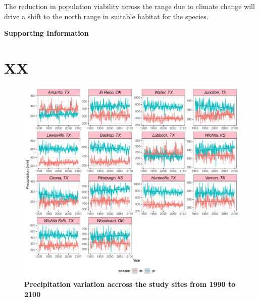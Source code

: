 \documentclass[12pt]{article}
\begin{document}
The reduction in population viability across the range due to climate change will drive a shift to the north range in suitable habitat for the species. 


\newpage


\newpage
\clearpage 
\setcounter{equation}{0}
\setcounter{figure}{0}
\setcounter{section}{0}
\setcounter{table}{0}
\renewcommand{\theequation}{S.\arabic{equation}}
\renewcommand{\thetable}{S-\arabic{table}}
\renewcommand{\thefigure}{S-\arabic{figure}}
\renewcommand{\thesection}{S.\arabic{section}}

\centerline{\Large{\textbf{Supporting Information}}}

\section {XX}	

\begin{figure}[H]
		\centering
		\includegraphics[width=0.95\linewidth]{Figures/fig_pr_past_present_future.pdf}
		\caption{\textbf{Precipitation variation accross the study sites from 1990 to 2100}}
		\label{Sup:pr_variation}
\end{figure}
\end{document}
